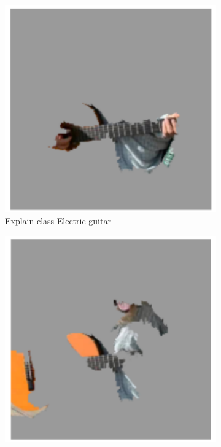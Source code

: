 \begin{figure}[H]
\begin{subfigure}[t]{.23\textwidth}
        \includegraphics[width=\linewidth]{chapters/02_methods/images/lime_dog_2.png}
        \caption{Explain class Electric guitar}
    \end{subfigure}\hfill%
    \begin{subfigure}[t]{.23\textwidth}
        \centering
        \includegraphics[width=\linewidth]{chapters/02_methods/images/lime_dog_3.png}

\end{subfigure}
\end{figure}
